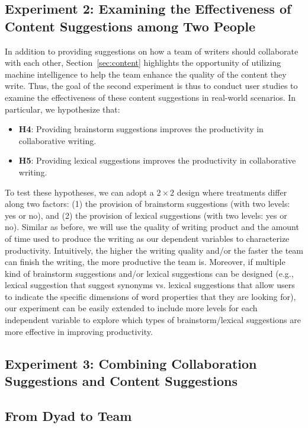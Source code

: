 \subsection{Experiment 2: Examining the Effectiveness of Content Suggestions among Two People}
\label{sec:exp2}
In addition to providing suggestions on how a team of writers should collaborate with each other, Section~\ref{sec:content} highlights the opportunity of utilizing machine intelligence to help the team enhance the quality of the content they write. Thus, the goal of the second experiment is thus to conduct user studies to examine the effectiveness of these content suggestions in real-world scenarios. In particular, we hypothesize that:
\begin{itemize}
\item{\bf H4}: Providing brainstorm suggestions improves the productivity in collaborative writing.
\item{\bf H5}: Providing lexical suggestions improves the productivity in collaborative writing.
\end{itemize}

To test these hypotheses, we can adopt a $2\times 2$ design where treatments differ along two factors: (1) the provision of brainstorm suggestions (with two levels: yes or no), and (2) the provision of lexical suggestions (with two levels: yes or no). Similar as before, we will use the quality of writing product and the amount of time used to produce the writing as our dependent variables to characterize productivity. Intuitively, the higher the writing quality and/or the faster the team can finish the writing, the more productive the team is. Moreover, if multiple kind of brainstorm suggestions and/or lexical suggestions can be designed (e.g., lexical suggestion that suggest synonyms vs. lexical suggestions that allow users to indicate the specific dimensions of word properties that they are looking for), our experiment can be easily extended to include more levels for each independent variable to explore which types of brainstorm/lexical suggestions are more effective in improving productivity.

\subsection{Experiment 3: Combining Collaboration Suggestions and Content Suggestions}
\label{sec:exp3}


\subsection{From Dyad to Team}
\label{sec:exp4}